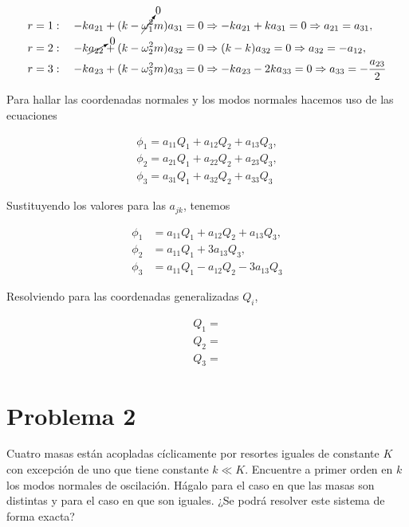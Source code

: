 \documentclass[a4paper,10pt]{article}
\numberwithin{equation}{section}
\begin{document}
\begin{align}
 r &= 1: \quad -ka_{21} + (k - \cancelto{0}{\omega_1^2}m)a_{31} = 0 \Rightarrow
 -ka_{21} + ka_{31} = 0 \Rightarrow a_{21} = a_{31}, \\
 r &= 2: \quad -k\cancelto{0}{a_{22}} + (k - \omega_2^2m)a_{32} = 0 \Rightarrow
 (k - k)a_{32} = 0 \Rightarrow a_{32} = - a_{12}, \\
 r &= 3: \quad -ka_{23} + (k - \omega_3^2m)a_{33} = 0 \Rightarrow
 -ka_{23} - 2ka_{33} = 0 \Rightarrow a_{33} = - \frac{a_{23}}{2}
\end{align}

Para hallar las coordenadas normales y los modos normales hacemos uso de las ecuaciones 
\cite{marion}

\begin{align}
 \phi_1 = a_{11}Q_1 + a_{12}Q_2 + a_{13}Q_3, \\
 \phi_2 = a_{21}Q_1 + a_{22}Q_2 + a_{23}Q_3, \\
 \phi_3 = a_{31}Q_1 + a_{32}Q_2 + a_{33}Q_3
\end{align}

Sustituyendo los valores para las $a_{jk}$, tenemos 

\begin{align}
 \phi_1 &= a_{11}Q_1 + a_{12}Q_2 + a_{13}Q_3, \\
 \phi_2 &= a_{11}Q_1 + 3a_{13}Q_3, \\
 \phi_3 &= a_{11}Q_1 - a_{12}Q_2 - 3a_{13}Q_3
\end{align}

Resolviendo para las coordenadas generalizadas $Q_i$, 

\begin{align}
 Q_1 = \\
 Q_2 = \\
 Q_3 = 
\end{align}


\section{Problema 2}

Cuatro masas están acopladas cíclicamente por resortes iguales de constante $K$ con 
excepción de uno que tiene constante $k \ll K$. Encuentre a primer orden en $k$ los 
modos normales de oscilación. Hágalo para el caso en que las masas son distintas 
y para el caso en que son iguales. ¿Se podrá resolver este sistema de forma exacta?

\vspace{.3cm}
\end{document}
